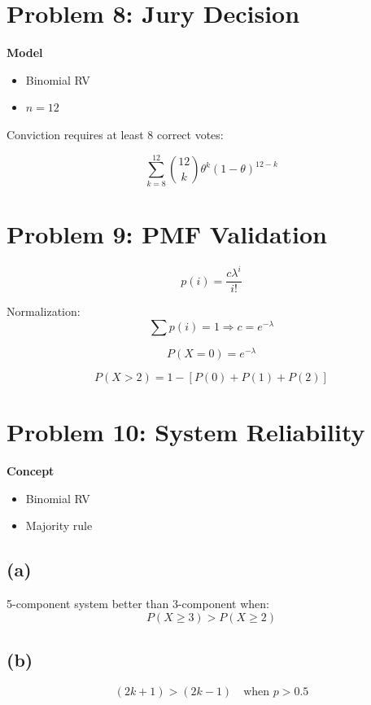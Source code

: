 \documentclass[11pt]{article}
\begin{document}
\newpage

\section*{Problem 8: Jury Decision}

\textbf{Model}
\begin{itemize}
    \item Binomial RV
    \item $n=12$
\end{itemize}

Conviction requires at least 8 correct votes:

\[
\sum_{k=8}^{12} \binom{12}{k}\theta^k(1-\theta)^{12-k}
\]

\newpage

\section*{Problem 9: PMF Validation}

\[
p(i)=\frac{c\lambda^i}{i!}
\]

Normalization:
\[
\sum p(i)=1 \Rightarrow c=e^{-\lambda}
\]

\[
P(X=0)=e^{-\lambda}
\]

\[
P(X>2)=1-[P(0)+P(1)+P(2)]
\]

\newpage

\section*{Problem 10: System Reliability}

\textbf{Concept}
\begin{itemize}
    \item Binomial RV
    \item Majority rule
\end{itemize}

\subsection*{(a)}

5-component system better than 3-component when:
\[
P(X \ge 3) > P(X \ge 2)
\]

\subsection*{(b)}

\[
(2k+1) > (2k-1) \quad \text{when } p>0.5
\]

\newpage
\end{document}
